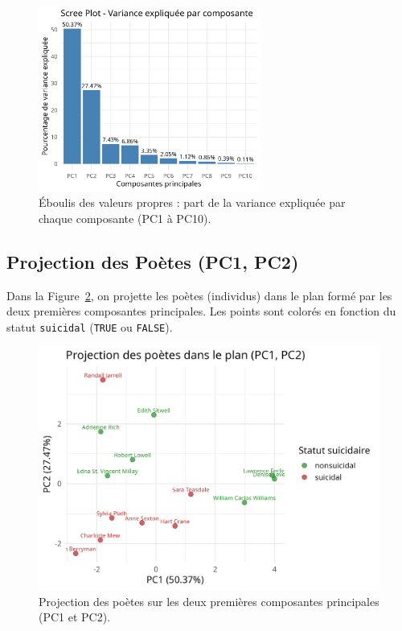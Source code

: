 \documentclass[12pt,a4paper]{article}
\begin{document}
\begin{figure}[htbp]
	\centering
	\includegraphics[width=0.65\textwidth]{01_scree_plot.png}
	\caption{Éboulis des valeurs propres : part de la variance expliquée par chaque composante (PC1 à PC10).}
	\label{fig:scree_plot}
\end{figure}

\subsection{Projection des Poètes (PC1, PC2)}
Dans la Figure~\ref{fig:acp_ind}, on projette les poètes (individus) 
dans le plan formé par les deux premières composantes principales. 
Les points sont colorés en fonction du statut \texttt{suicidal} 
(\texttt{TRUE} ou \texttt{FALSE}). 

\begin{figure}[htbp]
	\centering
	\includegraphics[width=1\textwidth]{02_individuals_PC1_PC2.png}
	\caption{Projection des poètes sur les deux premières composantes principales (PC1 et PC2).}
	\label{fig:acp_ind}
\end{figure}
\end{document}

